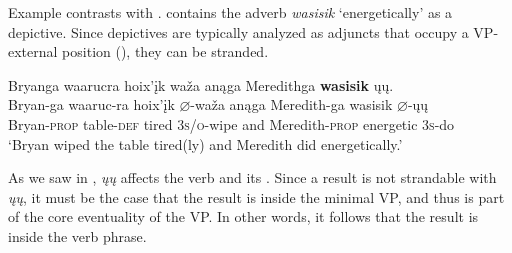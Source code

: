 \documentclass[output=paper]{LSP/langsci}
\begin{document}
\begin{exe}
\ex\label{ex:rosen:24}
\begin{xlist}



\end{xlist}
\end{exe}

Example  contrasts with .   contains the adverb \emph{wasisik} `energetically' as a depictive. Since depictives are typically analyzed as adjuncts that occupy a VP-external position (\citealt{LevinRappaportHovav1995}), they can be stranded.

\begin{exe}

\ex\label{ex:rosen:25} \glll Bryanga {\ob}{\sVP} waarucra hoix'įk waža{\cb} anąga  Meredithga \textbf{wasisik} {\ob}ųų{\cb}. \\
 Bryan-ga {} waaruc-ra hoix'įk {$\varnothing$}-waža anąga Meredith-ga  wasisik {$\varnothing$}-ųų\\
Bryan-\textsc{prop} {} table-\textsc{def} tired \textsc{3s/o}-wipe and Meredith-\textsc{prop}  energetic \textsc{3s}-do\\
\glt `Bryan wiped the table tired(ly) and Meredith did energetically.'

\end{exe}

As we saw in , \textit{ųų} affects the verb and its . Since a result  is not strandable with \textit{ųų}, it must be the case that the result is inside the minimal VP, and thus is part of the core eventuality of the VP. In other words, it follows that the result is inside the verb phrase.
\end{document}
